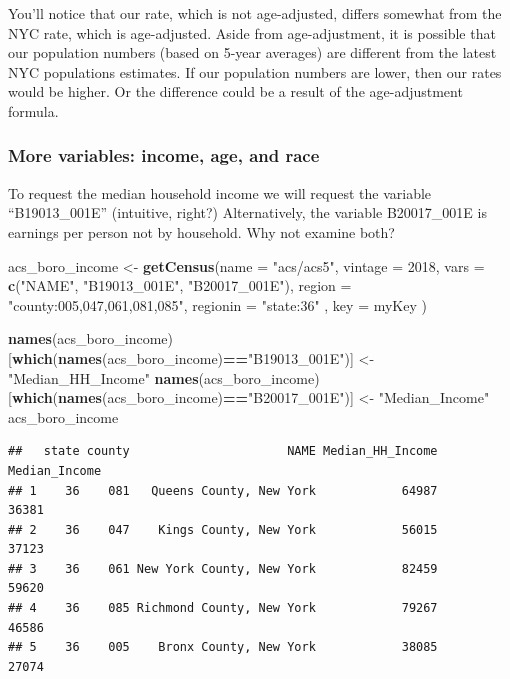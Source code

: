 \documentclass[openany]{book}
\newenvironment{Shaded}{\begin{snugshade}}{\end{snugshade}}
\newcommand{\DataTypeTok}[1]{\textcolor[rgb]{0.13,0.29,0.53}{#1}}
\newcommand{\DecValTok}[1]{\textcolor[rgb]{0.00,0.00,0.81}{#1}}
\newcommand{\KeywordTok}[1]{\textcolor[rgb]{0.13,0.29,0.53}{\textbf{#1}}}
\newcommand{\NormalTok}[1]{#1}
\newcommand{\OperatorTok}[1]{\textcolor[rgb]{0.81,0.36,0.00}{\textbf{#1}}}
\newcommand{\StringTok}[1]{\textcolor[rgb]{0.31,0.60,0.02}{#1}}
\begin{document}
You'll notice that our rate, which is not age-adjusted, differs somewhat from the NYC rate, which is age-adjusted. Aside from age-adjustment, it is possible that our population numbers (based on 5-year averages) are different from the latest NYC populations estimates. If our population numbers are lower, then our rates would be higher. Or the difference could be a result of the age-adjustment formula.

\hypertarget{more-variables-income-age-and-race}{%
\subsubsection*{More variables: income, age, and race}\label{more-variables-income-age-and-race}}

To request the median household income we will request the variable ``B19013\_001E'' (intuitive, right?) Alternatively, the variable B20017\_001E is earnings per person not by household. Why not examine both?

\begin{Shaded}
\begin{Highlighting}[]
\NormalTok{acs_boro_income <-}\StringTok{ }\KeywordTok{getCensus}\NormalTok{(}\DataTypeTok{name =} \StringTok{"acs/acs5"}\NormalTok{,}
                         \DataTypeTok{vintage =} \DecValTok{2018}\NormalTok{,}
                         \DataTypeTok{vars =} \KeywordTok{c}\NormalTok{(}\StringTok{"NAME"}\NormalTok{, }\StringTok{"B19013_001E"}\NormalTok{, }\StringTok{"B20017_001E"}\NormalTok{),}
                         \DataTypeTok{region =} \StringTok{"county:005,047,061,081,085"}\NormalTok{,}
                         \DataTypeTok{regionin =} \StringTok{"state:36"}\NormalTok{ , }\DataTypeTok{key =}\NormalTok{ myKey}
\NormalTok{                         )}

\KeywordTok{names}\NormalTok{(acs_boro_income)[}\KeywordTok{which}\NormalTok{(}\KeywordTok{names}\NormalTok{(acs_boro_income)}\OperatorTok{==}\StringTok{"B19013_001E"}\NormalTok{)] <-}\StringTok{ "Median_HH_Income"}
\KeywordTok{names}\NormalTok{(acs_boro_income)[}\KeywordTok{which}\NormalTok{(}\KeywordTok{names}\NormalTok{(acs_boro_income)}\OperatorTok{==}\StringTok{"B20017_001E"}\NormalTok{)] <-}\StringTok{ "Median_Income"}
\NormalTok{acs_boro_income}
\end{Highlighting}
\end{Shaded}

\begin{verbatim}
##   state county                      NAME Median_HH_Income Median_Income
## 1    36    081   Queens County, New York            64987         36381
## 2    36    047    Kings County, New York            56015         37123
## 3    36    061 New York County, New York            82459         59620
## 4    36    085 Richmond County, New York            79267         46586
## 5    36    005    Bronx County, New York            38085         27074
\end{verbatim}
\end{document}
